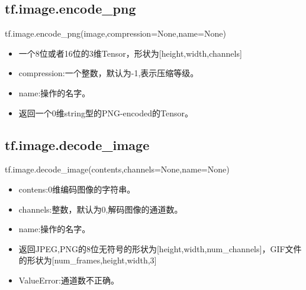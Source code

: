 {\begin{itemize}
\end{itemize}
\subsection{tf.image.encode\_png}
tf.image.encode\_png(image,compression=None,name=None)
\begin{itemize}
	\item 一个8位或者16位的3维Tensor，形状为[height,width,channels]
	\item compression:一个整数，默认为-1,表示压缩等级。
	\item name:操作的名字。
	\item 返回一个0维string型的PNG-encoded的Tensor。
\end{itemize}
\subsection{tf.image.decode\_image}
tf.image.decode\_image(contents,channels=None,name=None)
\begin{itemize}
	\item contens:0维编码图像的字符串。
	\item channels:整数，默认为0,解码图像的通道数。
	\item name:操作的名字。
	\item 返回JPEG,PNG的8位无符号的形状为[height,width,num\_channels]，GIF文件的形状为[num\_frames,height,width,3]
	\item ValueError:通道数不正确。
\end{itemize}
}
